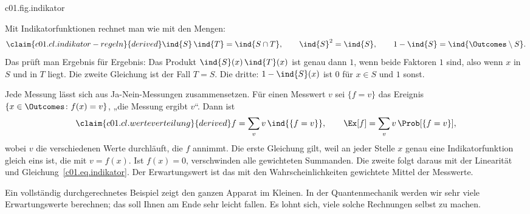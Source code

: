 \begin{tpcfigure}{c01.fig.indikator}
  \caption{Eine Ja-Nein-Messung am gezinkten Würfel aus Gleichung~\eqref{c01.eq.gezinkt}.
    (a) Die Indikatorfunktion des Ereignisses $S = \{2,4,6\}$, gestrichelt wie alle
    Messungen. (b) Die Gewichte $\pw(x)$ (Umrisse) und die Produkte $\pw(x)\,\ind{S}(x)$
    (schraffiert): Die Indikatorfunktion lässt nur die Balken über $S$ übrig. Ihre Höhen
    ergeben zusammen $\Ex[\ind{S}] = \Prob[S] = \tfrac{7}{12}$.}
\end{tpcfigure}

Mit Indikatorfunktionen rechnet man wie mit den Mengen:
\begin{equation}\label{c01.eq.indikator-regeln}\claim{c01.cl.indikator-regeln}{derived}
  \ind{S}\,\ind{T} = \ind{S \cap T},
  \qquad
  \ind{S}^2 = \ind{S},
  \qquad
  1 - \ind{S} = \ind{\Outcomes \setminus S} .
\end{equation}
Das prüft man Ergebnis für Ergebnis: Das Produkt $\ind{S}(x)\,\ind{T}(x)$ ist genau dann
$1$, wenn beide Faktoren $1$ sind, also wenn $x$ in $S$ und in $T$ liegt. Die zweite
Gleichung ist der Fall $T = S$. Die dritte: $1 - \ind{S}(x)$ ist $0$ für $x \in S$ und $1$
sonst.

Jede Messung lässt sich aus Ja-Nein-Messungen zusammensetzen. Für einen Messwert $v$ sei
$\{f = v\}$ das Ereignis $\{x \in \Outcomes \colon f(x) = v\}$, „die Messung ergibt $v$“.
Dann ist
\begin{equation}\label{c01.eq.werteverteilung}\claim{c01.cl.werteverteilung}{derived}
  f = \sum_{v} v\, \ind{\{f = v\}},
  \qquad
  \Ex[f] = \sum_{v} v\, \Prob[\{f = v\}] ,
\end{equation}
wobei $v$ die verschiedenen Werte durchläuft, die $f$ annimmt. Die erste Gleichung gilt,
weil an jeder Stelle $x$ genau eine Indikatorfunktion gleich eins ist, die mit
$v = f(x)$. Ist $f(x) = 0$, verschwinden alle gewichteten Summanden. Die zweite folgt daraus mit der Linearität und Gleichung~\eqref{c01.eq.indikator}. Der
Erwartungswert ist das mit den Wahrscheinlichkeiten gewichtete Mittel der Messwerte.

Ein vollständig durchgerechnetes Beispiel zeigt den ganzen Apparat im Kleinen. In der
Quantenmechanik werden wir sehr viele Erwartungswerte berechnen; das soll Ihnen am Ende sehr
leicht fallen. Es lohnt sich, viele solche Rechnungen selbst zu machen.

